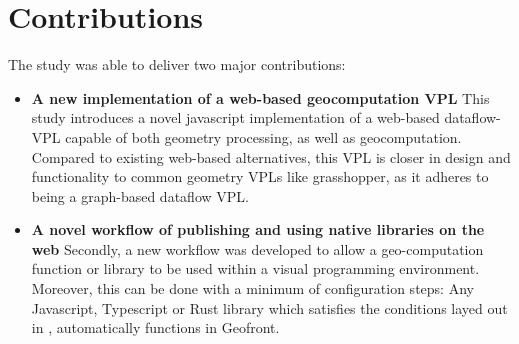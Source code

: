 \section{Contributions}
\label{sec:contribution}

The study was able to deliver two major contributions:
\begin{itemize}[-]
  \item \textbf{A new implementation of a web-based geocomputation VPL}
    This study introduces a novel javascript implementation of a web-based dataflow-VPL capable of both geometry processing, as well as geocomputation.
    Compared to existing web-based alternatives, this VPL is closer in design and functionality to common geometry VPLs like grasshopper, as it adheres to being a graph-based dataflow VPL. 


  \item \textbf{A novel workflow of publishing and using native libraries on the web}
    Secondly, a new workflow was developed to allow a geo-computation function or library to be used within a visual programming environment.
    Moreover, this can be done with a minimum of configuration steps: 
    Any Javascript, Typescript or Rust library which satisfies the conditions layed out in , automatically functions in Geofront.
    
\end{itemize}

